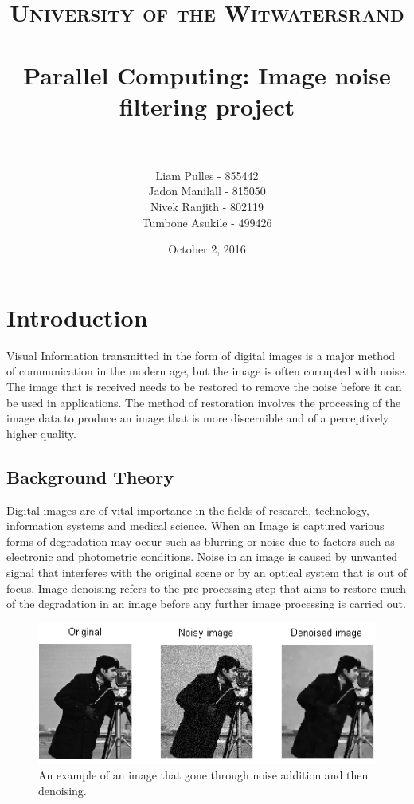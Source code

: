 \documentclass[paper=a4, fontsize=11pt]{scrartcl} %
\title{	
\normalfont \normalsize 
\textsc{University of the Witwatersrand} \\ [25pt] %
\horrule{0.5pt} \\[0.4cm] %
\huge Parallel Computing: Image noise filtering project \\ %
\horrule{2pt} \\[0.5cm] %
}
\author{Liam Pulles - 855442\\
  Jadon Manilall - 815050\\
  Nivek Ranjith - 802119\\
  Tumbone Asukile - 499426
        } %
\date{\normalsize October 2, 2016} %
\numberwithin{equation}{section} %
\numberwithin{figure}{section} %
\numberwithin{table}{section} %
\begin{document}
\maketitle %

\section{Introduction}
Visual Information transmitted in the form of digital images is a major method of communication in the modern age, but the image is often corrupted with noise. The image that is received needs to be restored to remove the noise before it can be used in applications. The method of restoration involves the processing of the image data to produce an image that is more discernible and of a perceptively higher quality.
\subsection{Background Theory}
Digital images are of vital importance in the fields of research, technology, information systems and medical science. When an Image is captured various forms of degradation may occur such as blurring or noise due to factors such as electronic and photometric conditions. Noise in an image is caused by unwanted signal that interferes with the original scene or by an optical system that is out of focus. Image denoising refers to the pre-processing step that aims to restore much of the degradation in an image before any further image processing is carried out.

\begin{figure}[H]
	\centering
	\includegraphics[scale=1]{"camera man"}
	\caption{An example of an image that gone through noise addition and then denoising.}
        \label{camera}
\end{figure}
\end{document}
